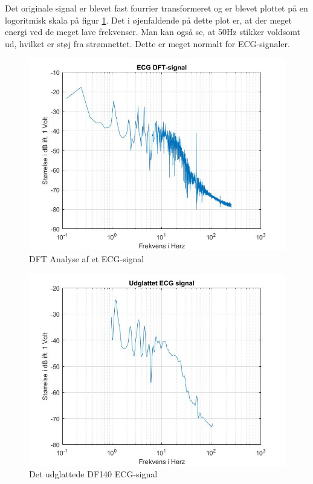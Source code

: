 Det originale signal er blevet fast fourrier transformeret og er blevet plottet på en logoritmisk skala på figur \ref{fig:ECG DFT}. Det i øjenfaldende på dette plot er, at der meget energi ved de meget lave frekvenser. Man kan også se, at 50Hz stikker voldsomt ud, hvilket er støj fra strømnettet. Dette er meget normalt for ECG-signaler.
\begin{figure}[H]
	\centering
	\includegraphics[width=140mm]{figures/ECG/DFT.jpg}
	\caption{DFT Analyse af et ECG-signal}
	\label{fig:ECG DFT}
\end{figure}


\begin{figure}[H]
	\centering
	\includegraphics[width=140mm]{figures/ECG/udglattet.jpg}
	\caption{Det udglattede DF140 ECG-signal}
	\label{fig:ECG udglattet}
\end{figure}

